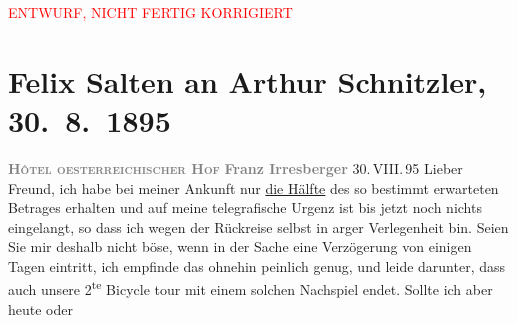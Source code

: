 
\begin{center}
            \textcolor{red}{ENTWURF, NICHT FERTIG KORRIGIERT}
                      \end{center}
            
         
         \renewcommand{\erwaehntePersonen}{Personen: Lou Andreas-Salomé, Richard Beer-Hofmann, Siegfried Bing, Emma Fr., Vincent van Gogh, Paul Goldmann, Franz Irresberger, Karl Kraus, Charlotte Pohl-Glas, Adele Sandrock}
         \renewcommand{\erwaehnteOrte}{Orte: Asien, Bad Ischl, Gmunden, Japan, München, Paris, Salzburg, Wien, Österreichischer Hof}
         \renewcommand{\erwaehnteWerke}{Werke: Ischler Brief. (Wiener Dichter auf der Esplanade.), Wiener Familien-Journal}
               \section[Felix Salten an Arthur Schnitzler, 30. 8. 1895]{ Felix Salten an Arthur Schnitzler, 30. 8. 1895}\nopagebreak{}\rehead{ }\begin{ledgroupsized}[t]{13cm}\normalsize\beginnumbering \toendnotes[C]{\smallbreak\pagebreak[2]} 
\toendnotes[C]{\smallbreak}\pstart
           \noindent{}\centering{}{\pb}\textcolor{gray}{\textbf{\textsc{Hôtel oesterreichischer Hof}}}\pend
           \pstart
           \noindent{}\centering{}\textcolor{gray}{\textbf{Franz Irresberger}}\pend
           \pstart
           \raggedleft{}30. VIII. 95\pend
           \pstart
           Lieber Freund, ich habe bei meiner Ankunft nur \uline{die Hälfte} des so bestimmt erwarteten Betrages erhalten und auf meine
               telegrafische Urgenz ist bis jetzt noch nichts eingelangt, so dass ich wegen der
               Rückreise selbst in arger Verlegenheit bin. Seien Sie mir deshalb nicht böse, wenn in
               der Sache eine Verzögerung von einigen Tagen eintritt, ich empfinde das ohnehin
               peinlich genug, und leide darunter, dass auch unsere 2\textsuperscript{te}
               Bicycle tour mit einem solchen Nachspiel endet. Sollte ich aber heute oder

\end{ledgroupsized}
